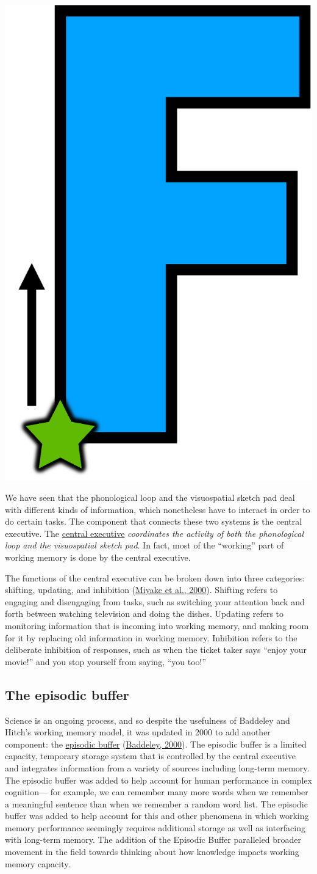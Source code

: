 \documentclass[
]{krantz}
\begin{document}
\begin{center}\includegraphics[width=0.1\linewidth]{images/ch4/fig3} \end{center}

We have seen that the phonological loop and the visuospatial sketch pad deal with different kinds of information, which nonetheless have to interact in order to do certain tasks. The component that connects these two systems is the central executive. The \protect\hyperlink{central-executive}{central executive} \emph{coordinates the activity of both the phonological loop and the visuospatial sketch pad}. In fact, most of the ``working'' part of working memory is done by the central executive.

The functions of the central executive can be broken down into three categories: shifting, updating, and inhibition (\protect\hyperlink{ref-Miyake2000}{Miyake et al., 2000}). Shifting refers to engaging and disengaging from tasks, such as switching your attention back and forth between watching television and doing the dishes. Updating refers to monitoring information that is incoming into working memory, and making room for it by replacing old information in working memory. Inhibition refers to the deliberate inhibition of responses, such as when the ticket taker says ``enjoy your movie!'' and you stop yourself from saying, ``you too!''

\hypertarget{the-episodic-buffer}{%
\subsection*{The episodic buffer}\label{the-episodic-buffer}}


Science is an ongoing process, and so despite the usefulness of Baddeley and Hitch's working memory model, it was updated in 2000 to add another component: the \protect\hyperlink{episodic-buffer}{episodic buffer} (\protect\hyperlink{ref-Baddeley2000}{Baddeley, 2000}). The episodic buffer is a limited capacity, temporary storage system that is controlled by the central executive and integrates information from a variety of sources including long-term memory. The episodic buffer was added to help account for human performance in complex cognition--- for example, we can remember many more words when we remember a meaningful sentence than when we remember a random word list. The episodic buffer was added to help account for this and other phenomena in which working memory performance seemingly requires additional storage as well as interfacing with long-term memory. The addition of the Episodic Buffer paralleled broader movement in the field towards thinking about how knowledge impacts working memory capacity.
\end{document}
